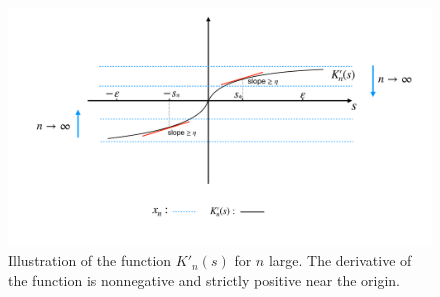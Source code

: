 \documentclass[12pt]{article}
\theoremstyle{definition}
\begin{document}
\begin{figure}[!ht]
	\centering
	\includegraphics[width=1\textwidth]{figures-and-tables/illustration_spsolution.pdf}
	\caption{Illustration of the function $K'_n(s)$ for $n$ large. The derivative of the function is nonnegative and strictly positive near the origin.}
	\label{fig:illustration_spsolution}
\end{figure}
\end{document}
